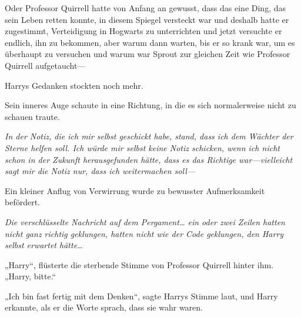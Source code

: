 Oder Professor Quirrell hatte von Anfang an gewusst, dass das eine Ding, das sein Leben retten konnte, in diesem Spiegel versteckt war und deshalb hatte er zugestimmt, Verteidigung in Hogwarts zu unterrichten und jetzt versuchte er endlich, ihn zu bekommen, aber warum dann warten, bis er so krank war, um es überhaupt zu versuchen und warum war Sprout zur gleichen Zeit wie Professor Quirrell aufgetaucht—

Harrys Gedanken stockten noch mehr.

Sein inneres Auge schaute in eine Richtung, in die es sich normalerweise nicht zu schauen traute.

\emph{In der Notiz, die ich mir selbst geschickt habe, stand, dass ich dem Wächter der Sterne helfen soll. Ich würde mir selbst keine Notiz schicken, wenn ich nicht schon in der Zukunft herausgefunden hätte, dass es das Richtige war—vielleicht sagt mir die Notiz nur, dass ich weitermachen soll—}

Ein kleiner Anflug von Verwirrung wurde zu bewusster Aufmerksamkeit befördert.

\emph{Die verschlüsselte Nachricht auf dem Pergament… ein oder zwei Zeilen hatten nicht ganz richtig geklungen, hatten nicht wie der Code geklungen, den Harry selbst erwartet hätte…}

„Harry“, flüsterte die sterbende Stimme von Professor Quirrell hinter ihm. „Harry, bitte.“

„Ich bin fast fertig mit dem Denken“, sagte Harrys Stimme laut, und Harry erkannte, als er die Worte sprach, dass sie wahr waren.

